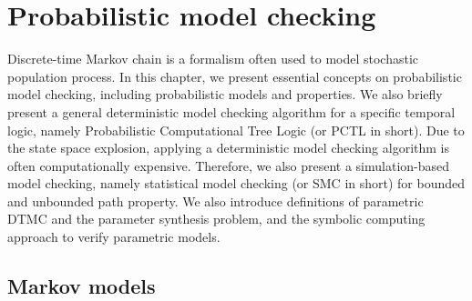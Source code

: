 \chapter{Probabilistic model checking}
Discrete-time Markov chain is a formalism often used to model stochastic population process. In this
chapter, we present essential concepts on probabilistic model checking, including probabilistic
models and properties. We also briefly present a general deterministic model checking algorithm for
a specific temporal logic, namely Probabilistic Computational Tree Logic (or PCTL in short). Due to
the state space explosion, applying a deterministic model checking algorithm is often
computationally expensive. Therefore, we also present a simulation-based model checking, namely
statistical model checking (or SMC in short) for bounded and unbounded path property. We also
introduce definitions of parametric DTMC and the parameter synthesis problem, and the symbolic
computing approach to verify parametric models.


\section{Markov models}
